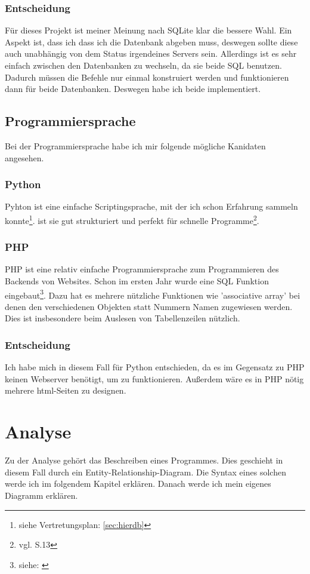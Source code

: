 \documentclass[a4paper, 12pt]{article}
\theoremstyle{plain}
\theoremstyle{definition}
\begin{document}
	
	\subsubsection{Entscheidung}
	Für dieses Projekt ist meiner Meinung nach SQLite klar die bessere Wahl. Ein Aspekt ist, dass ich dass ich die Datenbank abgeben muss,  deswegen sollte diese auch unabhängig von dem Status irgendeines Servers sein. Allerdings ist es sehr einfach zwischen den Datenbanken zu wechseln, da sie beide SQL benutzen. Dadurch müssen die Befehle nur einmal konstruiert werden und funktionieren dann für beide Datenbanken. Deswegen habe ich beide implementiert.
	
	\subsection{Programmiersprache}
	Bei der Programmiersprache habe ich mir folgende mögliche Kanidaten angesehen.
	\subsubsection{Python}
	\label{sec:py}
	Pyhton ist eine einfache Scriptingsprache, mit der ich schon Erfahrung sammeln konnte\footnote{siehe Vertretungsplan: \ref{sec:hierdb}}.  ist sie gut strukturiert und perfekt für schnelle Programme\footnote{vgl. \cite{Dave13} S.13}.
	
	\subsubsection{PHP}
	\label{sec:php}
	PHP ist eine relativ einfache Programmiersprache zum Programmieren des Backends von Websites. Schon im ersten Jahr wurde eine SQL Funktion eingebaut\footnote{siehe: \cite{phpGesch}}. Dazu hat es mehrere nützliche Funktionen wie 'associative array' bei denen den verschiedenen Objekten statt Nummern Namen zugewiesen werden. Dies ist insbesondere beim Auslesen von Tabellenzeilen nützlich.
	
	\subsubsection{Entscheidung}
	Ich habe mich in diesem Fall für Python entschieden, da es im Gegensatz zu PHP keinen Webserver benötigt, um zu funktionieren. Außerdem wäre es in PHP nötig mehrere html-Seiten zu designen.
	
	\section{Analyse}
	\label{sec:loes}
	Zu der Analyse gehört das Beschreiben eines Programmes. Dies geschieht in diesem Fall durch ein Entity-Relationship-Diagram. Die Syntax eines solchen werde ich im folgendem Kapitel erklären. Danach werde ich mein eigenes Diagramm erklären.
	
\end{document}
